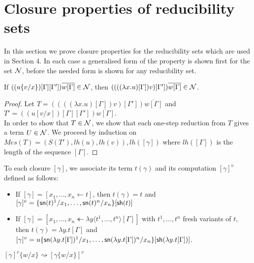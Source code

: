 \documentclass{llncs} %
\begin{document}



\section{Closure properties of reducibility sets}\label{sec:ClosPropRedSets}


In this section we prove closure properties for the reducibility sets
which are used in Section 4. In each case  a
generalised form of the property is shown first for the set $\mathcal{N}$,
before the needed form is shown for any reducibility set.

\begin{lemma}\label{lem:IntCaseLambda0}
If $((u\{v/x\})[\Gamma][\Gamma'])\overline{w[\Gamma]} \in \mathcal{N}$, then $((((\lambda x.u)[\Gamma]) v)[\Gamma'])\overline{w[\Gamma]} \in \mathcal{N}$.
\end{lemma}

\begin{proof}
 Let $T = ((((\lambda x.u)[\Gamma]) v)[\Gamma'])\overline{w[\Gamma]}$ and $T' = ((u[v/x])[\Gamma][\Gamma'])\overline{w[\Gamma]}$.
\\
In order to show that $T\in\mathcal{N}$, we show that each one-step reduction from $T$ gives a term $U\in\mathcal{N}$.
%
We proceed by induction on $Mes(T) = (S(T'), lh(u), lh(v)), lh([\gamma])$ where
 $lh([\Gamma])$ is the length of the sequence $[\Gamma]$.
\end{proof}

\newcommand{\term}{{\mathsf{t}}}

To each closure $[\gamma]$, we associate its term $t(\gamma)$ and its computation $[\gamma]^v $ defined as follows:
\begin{itemize}
 \item If $[\gamma] = [x_1,\dots,x_n \leftarrow t]$, then $t(\gamma) = t$  and $[\gamma]^v = \{{\mathsf{sn}}(t)^1/x_1,\dots,{\mathsf{sn}}(t)^n/x_n\}[{\mathsf{sh}} (t)]$
 \item If $[\gamma] = [x_1,\dots,x_n \twoheadleftarrow \lambda y\langle t^1,\dots,t^n \rangle[\Gamma]]$ with $t^1,\dots,t^n$  fresh variants of $t$, then  $t(\gamma) = \lambda y.t[\Gamma]$  and $[\gamma]^v = u\{{\mathsf{sn}}(\lambda y.t[\Gamma])^1/x_1,\dots,{\mathsf{sn}}(\lambda y.t[\Gamma])^n/x_n\}[{\mathsf{sh}} (\lambda y.t[\Gamma])]$.
\end{itemize}

\begin{lemma}\label{lem:CompSubst}
 $[\gamma]^v \{w/x\} \rightsquigarrow [\gamma\{w/x\} ]^v$
\end{lemma}
\end{document}
